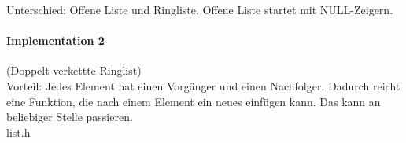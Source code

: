 Unterschied: Offene Liste und Ringliste. Offene Liste startet mit NULL-Zeigern.

\paragraph{Implementation 2} (Doppelt-verkettte Ringlist)\\
Vorteil: Jedes Element hat einen Vorgänger und einen Nachfolger. Dadurch reicht eine Funktion, die nach einem Element ein neues einfügen kann. Das kann an beliebiger Stelle passieren.\\
list.h\\


\newpage
